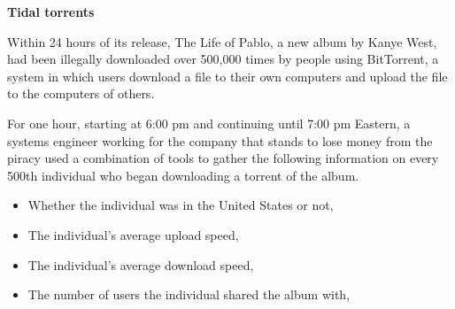 \documentclass[addpoints]{examsetup}\usepackage[]{graphicx}\usepackage[]{color}
\begin{document}
\begin{questions}

\pagebreak

\question

\textbf{Tidal torrents}

Within 24 hours of its release, The Life of Pablo, a new album by Kanye West, had been illegally downloaded over 500,000 times by people using BitTorrent,
a system in which users download a file to their own computers and upload the file to the computers of others.

For one hour, starting at 6:00 pm and continuing until 7:00 pm Eastern, 
a systems engineer working for the company that stands to lose money from the piracy used a combination of tools to gather the following information on every 
500th individual who began downloading a torrent of the album.

\begin{itemize}
   \item Whether the individual was in the United States or not,
   \item The individual's average upload speed,
   \item The individual's average download speed,
   \item The number of users the individual shared the album with,
\end{itemize}


\end{questions}
\end{document}
